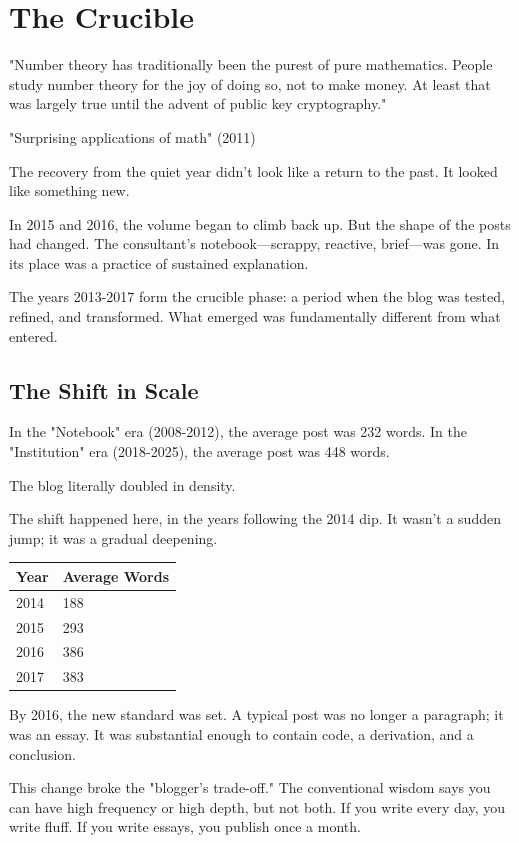 \chapter{The Crucible}

\nopagebreak
\epigraph{"Number theory has traditionally been the purest of pure mathematics. People study number theory for the joy of doing so, not to make money. At least that was largely true until the advent of public key cryptography."}{"Surprising applications of math" (2011)}
\nopagebreak

The recovery from the quiet year didn't look like a return to the past. It looked like something new.

In 2015 and 2016, the volume began to climb back up. But the shape of the posts had changed. The consultant's notebook---scrappy, reactive, brief---was gone. In its place was a practice of sustained explanation.

The years 2013-2017 form the crucible phase: a period when the blog was tested, refined, and transformed. What emerged was fundamentally different from what entered.

\bigskip

\section*{The Shift in Scale}

In the "Notebook" era (2008-2012), the average post was 232 words.
In the "Institution" era (2018-2025), the average post was 448 words.

The blog literally doubled in density.

The shift happened here, in the years following the 2014 dip. It wasn't a sudden jump; it was a gradual deepening.

\begin{longtable}{l p{6.5cm}}
\toprule
\textbf{Year} & \textbf{Average Words} \tabularnewline
\midrule
2014 & 188 \tabularnewline
2015 & 293 \tabularnewline
2016 & 386 \tabularnewline
2017 & 383 \tabularnewline
\bottomrule
\end{longtable}

By 2016, the new standard was set. A typical post was no longer a paragraph; it was an essay. It was substantial enough to contain code, a derivation, and a conclusion.

This change broke the "blogger's trade-off." The conventional wisdom says you can have high frequency or high depth, but not both. If you write every day, you write fluff. If you write essays, you publish once a month.

